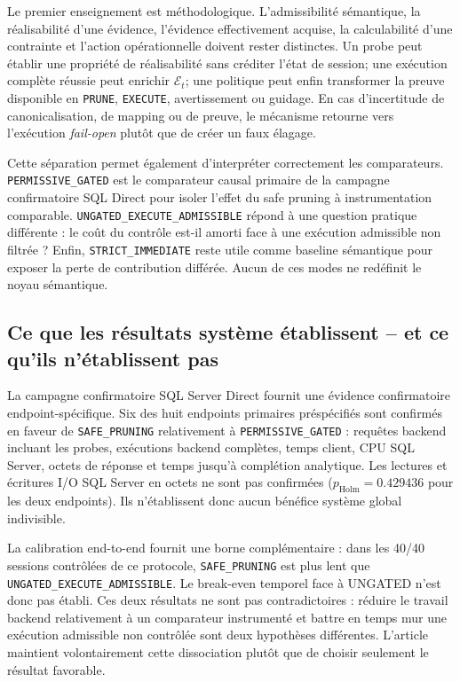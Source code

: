 \documentclass[journal]{IEEEtran}
\begin{document}
Le premier enseignement est méthodologique. L'admissibilité sémantique, la réalisabilité d'une évidence, l'évidence effectivement acquise, la calculabilité d'une contrainte et l'action opérationnelle doivent rester distinctes. Un probe peut établir une propriété de réalisabilité sans créditer l'état de session; une exécution complète réussie peut enrichir $\mathcal{E}_t$; une politique peut enfin transformer la preuve disponible en \texttt{PRUNE}, \texttt{EXECUTE}, avertissement ou guidage. En cas d'incertitude de canonicalisation, de mapping ou de preuve, le mécanisme retourne vers l'exécution \emph{fail-open} plutôt que de créer un faux élagage.

Cette séparation permet également d'interpréter correctement les comparateurs. \texttt{PERMISSIVE\_GATED} est le comparateur causal primaire de la campagne confirmatoire SQL Direct pour isoler l'effet du safe pruning à instrumentation comparable. \texttt{UNGATED\_EXECUTE\_ADMISSIBLE} répond à une question pratique différente : le coût du contrôle est-il amorti face à une exécution admissible non filtrée ? Enfin, \texttt{STRICT\_IMMEDIATE} reste utile comme baseline sémantique pour exposer la perte de contribution différée. Aucun de ces modes ne redéfinit le noyau sémantique.

\subsection{Ce que les résultats système établissent -- et ce qu'ils n'établissent pas}

La campagne confirmatoire SQL Server Direct fournit une évidence confirmatoire endpoint-spécifique. Six des huit endpoints primaires préspécifiés sont confirmés en faveur de \texttt{SAFE\_PRUNING} relativement à \texttt{PERMISSIVE\_GATED} : requêtes backend incluant les probes, exécutions backend complètes, temps client, CPU SQL Server, octets de réponse et temps jusqu'à complétion analytique. Les lectures et écritures I/O SQL Server en octets ne sont pas confirmées ($p_{\mathrm{Holm}}=0.429436$ pour les deux endpoints). Ils n'établissent donc aucun bénéfice système global indivisible.

La calibration end-to-end fournit une borne complémentaire : dans les 40/40 sessions contrôlées de ce protocole, \texttt{SAFE\_PRUNING} est plus lent que \texttt{UNGATED\_EXECUTE\_ADMISSIBLE}. Le break-even temporel face à UNGATED n'est donc pas établi. Ces deux résultats ne sont pas contradictoires : réduire le travail backend relativement à un comparateur instrumenté et battre en temps mur une exécution admissible non contrôlée sont deux hypothèses différentes. L'article maintient volontairement cette dissociation plutôt que de choisir seulement le résultat favorable.
\end{document}
